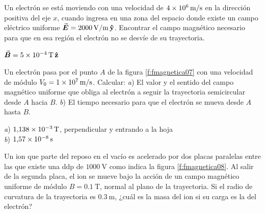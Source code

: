 %
\begin{Exercise}
  Un electrón se está moviendo con una velocidad de $\SI{4E6}{\metre/\second}$ en la dirección positiva del eje $x$, cuando ingresa en una zona del espacio donde existe un campo eléctrico uniforme $\va*{E} = \SI{2000}{\volt/\metre}\,\vu{y}$. Encontrar el campo magnético necesario para que en esa región el electrón no se desvíe de su trayectoria.
\end{Exercise}
\begin{Answer}
  $\va*{B} = \SI{5E-4}{\tesla}\,\vu{z}$
\end{Answer}
%
\begin{Exercise}\label{p:fmagnetica07}
  Un electrón pasa por el punto $A$ de la figura \ref{f:fmagnetica07} con una velocidad de módulo $V_0 = \SI{1E7}{\metre/\second}$. Calcular: \textit{a}) El valor y el sentido del campo magnético uniforme que obliga al electrón a seguir la trayectoria semicircular desde $A$ hacia $B$. \textit{b}) El tiempo necesario para que el electrón se mueva desde $A$ hasta $B$.
\end{Exercise}
\begin{Answer}
  \begin{minipage}[t]{.4\textwidth}
    \textit{a}) $\SI{1.138E-3}{\tesla}$, perpendicular y entrando a la hoja\\ \textit{b}) $\SI{1.57E-8}{\second}$
  \end{minipage}
\end{Answer}
%
\begin{center}
\end{center}
%
\begin{Exercise}\label{p:fmagnetica08}
  Un ion que parte del reposo en el vacío es acelerado por dos placas paralelas entre las que existe una ddp de $\SI{1000}{\volt}$ como indica la figura \ref{f:fmagnetica08}. Al salir de la segunda placa, el ion se mueve bajo la acción de un campo magnético uniforme de módulo $B = \SI{0.1}{\tesla}$, normal al plano de la trayectoria. Si el radio de curvatura de la trayectoria es $\SI{0.3}{\metre}$, ¿cuál es la masa del ion si su carga es la del electrón?
\end{Exercise}
